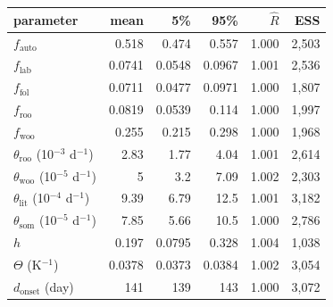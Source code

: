 \begin{tabular}[t]{lrrrrr}
\toprule
parameter & mean & 5\% & 95\% & $\hat R$ & ESS \\
\midrule
$f_\text{auto}$ & 0.518 & 0.474 & 0.557 & 1.000 & 2,503 \\
$f_\text{lab}$ & 0.0741 & 0.0548 & 0.0967 & 1.001 & 2,536 \\
$f_\text{fol}$ & 0.0711 & 0.0477 & 0.0971 & 1.000 & 1,807 \\
$f_\text{roo}$ & 0.0819 & 0.0539 & 0.114 & 1.000 & 1,997 \\
$f_\text{woo}$ & 0.255 & 0.215 & 0.298 & 1.000 & 1,968 \\
$\theta_\text{roo}$ (10$^{-3}$ d$^{-1}$) & 2.83 & 1.77 & 4.04 & 1.001 & 2,614 \\
$\theta_\text{woo}$ (10$^{-5}$ d$^{-1}$) & 5 & 3.2 & 7.09 & 1.002 & 2,303 \\
$\theta_\text{lit}$ (10$^{-4}$ d$^{-1}$) & 9.39 & 6.79 & 12.5 & 1.001 & 3,182 \\
$\theta_\text{som}$ (10$^{-5}$ d$^{-1}$) & 7.85 & 5.66 & 10.5 & 1.000 & 2,786 \\
$h$ & 0.197 & 0.0795 & 0.328 & 1.004 & 1,038 \\
$\Theta$ (K$^{-1}$) & 0.0378 & 0.0373 & 0.0384 & 1.002 & 3,054 \\
$d_\text{onset}$ (day) & 141 & 139 & 143 & 1.000 & 3,072 \\
\bottomrule
\end{tabular}
